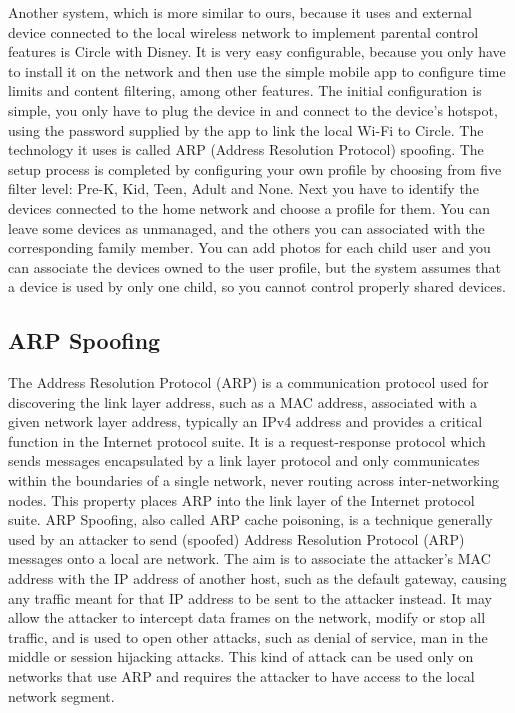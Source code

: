 Another system, which is more similar to ours, because it uses and external device connected to the local wireless network to implement parental control features is Circle with Disney. It is very easy configurable, because you only have to install it on the network and then use the simple mobile app to configure time limits and content filtering, among other features. The initial configuration is simple, you only have to plug the device in and connect to the device's hotspot, using the password supplied by the app to link the local Wi-Fi to Circle. The technology it uses is called ARP (Address Resolution Protocol) spoofing. The setup process is completed by configuring your own profile by choosing from five filter level: Pre-K, Kid, Teen, Adult and None. Next you have to identify the devices connected to the home network and choose a profile for them. You can leave some devices as unmanaged, and the others you can associated with the corresponding family member. You can add photos for each child user and you can associate the devices owned to the user profile, but the system assumes that a device is used by only one child, so you cannot control properly shared devices. \parencite{circlePCMag}

\subsection{ARP Spoofing}

The Address Resolution Protocol (ARP) is a communication protocol used for discovering the link layer address, such as a MAC address, associated with a given network layer address, typically an IPv4 address and provides a critical function in the Internet protocol suite. \parencite{plummer1982ethernet} It is a request-response protocol which sends messages encapsulated by a link layer protocol and only communicates within the boundaries of a single network, never routing across inter-networking nodes. This property places ARP into the link layer of the Internet protocol suite. \parencite{braden1989rfc} ARP Spoofing, also called ARP cache poisoning, is a technique generally used by an attacker to send (spoofed) Address Resolution Protocol (ARP) messages onto a local are network. The aim is to associate the attacker's MAC address with the IP address of another host, such as the default gateway, causing any traffic meant for that IP address to be sent to the attacker instead. It may allow the attacker to intercept data frames on the network, modify or stop all traffic, and is used to open other attacks, such as denial of service, man in the middle or session hijacking attacks. \parencite{ramachandran2005detecting} This kind of attack can be used only on networks that use ARP and requires the attacker to have access to the local network segment. \parencite{lockhart2004network}

